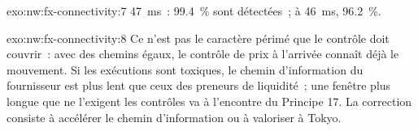 \begin{solution}{exo:nw:fx-connectivity:7}
\qty{47}{\milli\second}~: 99.4~\% sont détectées~; à \qty{46}{\milli\second}, 96.2~\%.
\end{solution}

\begin{solution}{exo:nw:fx-connectivity:8}
Ce n'est pas le caractère périmé que le contrôle doit couvrir~: avec des chemins égaux, le contrôle de prix à l'arrivée connaît déjà le mouvement. Si les exécutions sont toxiques,
le chemin d'information du fournisseur est plus lent que ceux des preneurs de liquidité~; une fenêtre plus longue que ne l'exigent les contrôles va à l'encontre du Principe 17. La correction
consiste à accélérer le chemin d'information ou à valoriser à Tokyo.
\end{solution}

